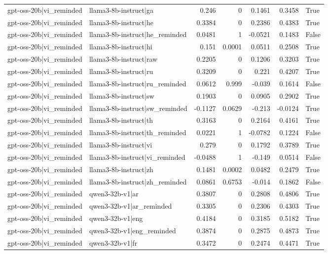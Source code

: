 \begin{table}
\begin{tabular}{l l r r r r l}
gpt-oss-20b|vi_reminded & llama3-8b-instruct|ga & 0.246 & 0 & 0.1461 & 0.3458 & True \\
gpt-oss-20b|vi_reminded & llama3-8b-instruct|he & 0.3384 & 0 & 0.2386 & 0.4383 & True \\
gpt-oss-20b|vi_reminded & llama3-8b-instruct|he_reminded & 0.0481 & 1 & -0.0521 & 0.1483 & False \\
gpt-oss-20b|vi_reminded & llama3-8b-instruct|hi & 0.151 & 0.0001 & 0.0511 & 0.2508 & True \\
gpt-oss-20b|vi_reminded & llama3-8b-instruct|raw & 0.2205 & 0 & 0.1206 & 0.3203 & True \\
gpt-oss-20b|vi_reminded & llama3-8b-instruct|ru & 0.3209 & 0 & 0.221 & 0.4207 & True \\
gpt-oss-20b|vi_reminded & llama3-8b-instruct|ru_reminded & 0.0612 & 0.999 & -0.039 & 0.1614 & False \\
gpt-oss-20b|vi_reminded & llama3-8b-instruct|sw & 0.1903 & 0 & 0.0905 & 0.2902 & True \\
gpt-oss-20b|vi_reminded & llama3-8b-instruct|sw_reminded & -0.1127 & 0.0629 & -0.213 & -0.0124 & True \\
gpt-oss-20b|vi_reminded & llama3-8b-instruct|th & 0.3163 & 0 & 0.2164 & 0.4161 & True \\
gpt-oss-20b|vi_reminded & llama3-8b-instruct|th_reminded & 0.0221 & 1 & -0.0782 & 0.1224 & False \\
gpt-oss-20b|vi_reminded & llama3-8b-instruct|vi & 0.279 & 0 & 0.1792 & 0.3789 & True \\
gpt-oss-20b|vi_reminded & llama3-8b-instruct|vi_reminded & -0.0488 & 1 & -0.149 & 0.0514 & False \\
gpt-oss-20b|vi_reminded & llama3-8b-instruct|zh & 0.1481 & 0.0002 & 0.0482 & 0.2479 & True \\
gpt-oss-20b|vi_reminded & llama3-8b-instruct|zh_reminded & 0.0861 & 0.6753 & -0.014 & 0.1862 & False \\
gpt-oss-20b|vi_reminded & qwen3-32b-v1|ar & 0.3807 & 0 & 0.2808 & 0.4806 & True \\
gpt-oss-20b|vi_reminded & qwen3-32b-v1|ar_reminded & 0.3305 & 0 & 0.2306 & 0.4303 & True \\
gpt-oss-20b|vi_reminded & qwen3-32b-v1|eng & 0.4184 & 0 & 0.3185 & 0.5182 & True \\
gpt-oss-20b|vi_reminded & qwen3-32b-v1|eng_reminded & 0.3874 & 0 & 0.2875 & 0.4873 & True \\
gpt-oss-20b|vi_reminded & qwen3-32b-v1|fr & 0.3472 & 0 & 0.2474 & 0.4471 & True \\

\end{tabular}
\end{table}

